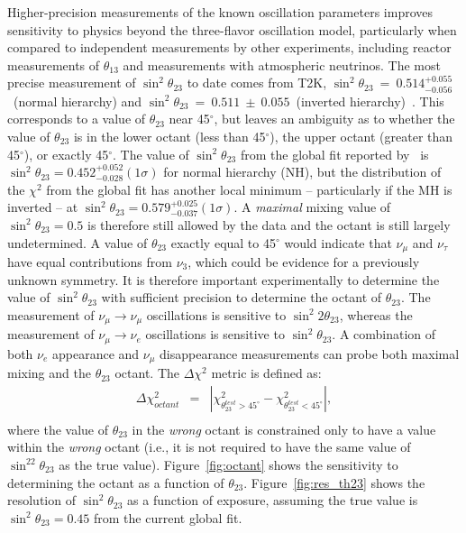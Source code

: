Higher-precision measurements of the known oscillation parameters
improves sensitivity to physics beyond the three-flavor oscillation model,
particularly when compared to independent measurements by other
experiments, including reactor measurements of $\theta_{13}$ and
measurements with atmospheric neutrinos.
The most precise measurement of $\sin^2\theta_{23}$ to date comes from
T2K, $\sin^2\theta_{23}~=~0.514^{+0.055}_{-0.056}$~(normal hierarchy)
and $\sin^2\theta_{23}~=~0.511~\pm~0.055$~(inverted
hierarchy)~\cite{Abe:2015awa}.  This corresponds to a value of
$\theta_{23}$ near 45\mbox{$^{\circ}$}, but leaves an ambiguity as to
whether the value of $\theta_{23}$ is in the lower octant (less than
45\mbox{$^{\circ}$}), the upper octant (greater than
45\mbox{$^{\circ}$}), or exactly 45\mbox{$^{\circ}$}.  The value of
$\sin^2 \theta_{23}$ from the global fit reported
by~\cite{Gonzalez-Garcia:2014bfa} is $\sin ^2 \theta_{23} = 0.452
^{+0.052} _{-0.028} (1 \sigma)$ for normal hierarchy (NH), but the
distribution of the $\chi^2$ from the global fit has another local
minimum -- particularly if the MH is inverted -- at $\sin^2
\theta_{23} = 0.579 ^{+0.025} _{-0.037} (1 \sigma)$. A \emph{maximal}
mixing value of $\sin^2 \theta_{23} =0.5$ is therefore still allowed
by the data and the octant is still largely undetermined.  A value of
$\theta_{23}$ exactly equal to 45\mbox{$^{\circ}$} would indicate that
$\nu_{\mu}$ and $\nu_{\tau}$ have equal contributions from $\nu_3$,
which could be evidence for a previously unknown symmetry.  It is
therefore important experimentally to determine the value of $\sin ^2
\theta_{23}$ with sufficient precision to determine the octant of
$\theta_{23}$.  The measurement of $\nu_\mu \rightarrow \nu_\mu$
oscillations is sensitive to $\sin ^2 2 \theta_{23}$, whereas the
measurement of $\nu_\mu \rightarrow \nu_e$ oscillations is sensitive
to $\sin^2 \theta_{23}$.  A combination of both $\nu_e$ appearance and
$\nu_\mu$ disappearance measurements can probe both maximal mixing and
the $\theta_{23}$ octant.  The $\Delta\chi^2$ metric is defined as:
\begin{eqnarray}
\Delta\chi^2_{octant} & = & |\chi^2_{\theta_{23}^{test}>45^\circ} - \chi^2_{\theta_{23}^{test}<45^\circ}|, \\ \nonumber
\end{eqnarray}
where the value of $\theta_{23}$ in the \emph{wrong} octant is constrained 
only to have a value within the \emph{wrong} octant (i.e., it is not required
to have the same value of $\sin^22\theta_{23}$ as the true value).
Figure~\ref{fig:octant} shows the sensitivity to determining the octant as a function of $\theta_{23}$.  Figure~\ref{fig:res_th23} shows the resolution of $\sin^2\theta_{23}$ as a function of exposure, assuming the true value is $\sin^2\theta_{23} = 0.45$ from the current global fit.

